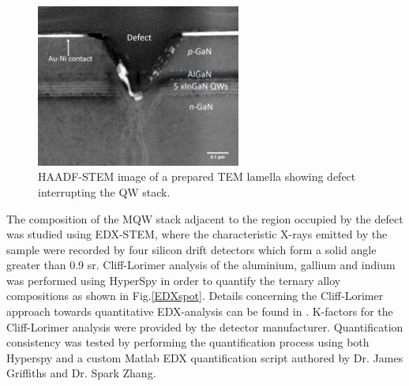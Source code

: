 \begin{figure}[h]
	\centering
	\includegraphics[width=0.6\textwidth]{Figs/Ch3/STEM-spot}
	\caption[h] {HAADF-STEM image of a prepared TEM lamella showing defect interrupting the QW stack.}
	\label{STEM-spot}
\end{figure}
\FloatBarrier 

The composition of the MQW stack adjacent to the region occupied by the defect was studied using EDX-STEM, where the characteristic X-rays emitted by the sample were recorded by four silicon drift detectors which form a solid angle greater than 0.9 sr. Cliff-Lorimer analysis of the aluminium, gallium and indium was performed using HyperSpy \cite{Pena} in order to quantify the ternary alloy compositions as shown in Fig.\ref{EDXspot}. Details concerning the Cliff-Lorimer approach towards quantitative EDX-analysis can be found in \cite{Lorimer1987}. K-factors for the Cliff-Lorimer analysis were provided by the detector manufacturer. Quantification consistency was tested by performing the quantification process using both Hyperspy and a custom Matlab EDX quantification script authored by Dr. James Griffiths and Dr. Spark Zhang.

